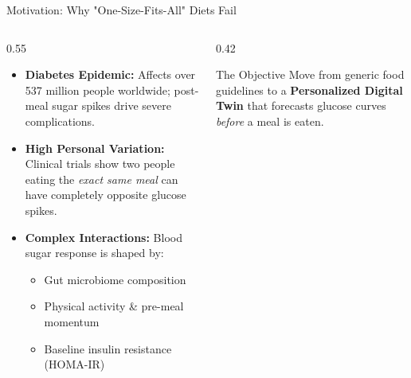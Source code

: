 \documentclass[aspectratio=169, 10pt]{beamer}
\begin{document}
\begin{frame}{Motivation: Why "One-Size-Fits-All" Diets Fail}
  \begin{columns}[c]
    \begin{column}{0.55\textwidth}
      \begin{itemize}\setlength{\itemsep}{0.8em}
        \item \textbf{Diabetes Epidemic:} Affects over 537 million people worldwide; post-meal sugar spikes drive severe complications.
        \item \textbf{High Personal Variation:} Clinical trials show two people eating the \emph{exact same meal} can have completely opposite glucose spikes.
        \item \textbf{Complex Interactions:} Blood sugar response is shaped by:
        \begin{itemize}\setlength{\itemsep}{0.3em}
          \item Gut microbiome composition
          \item Physical activity \& pre-meal momentum
          \item Baseline insulin resistance (HOMA-IR)
        \end{itemize}
      \end{itemize}
    \end{column}
    
    \begin{column}{0.42\textwidth}
      \begin{exampleblock}{The Objective}
        Move from generic food guidelines to a \textbf{Personalized Digital Twin} that forecasts glucose curves \emph{before} a meal is eaten.
      \end{exampleblock}
    \end{column}
  \end{columns}
\end{frame}
\end{document}

